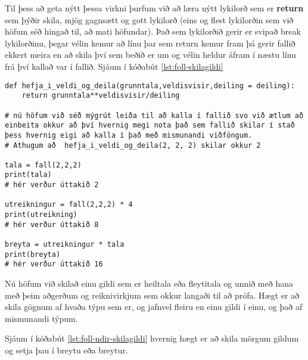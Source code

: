 Til þess að geta nýtt þessa virkni þurfum við að læra nýtt lykilorð sem er \textbf{return} sem þýðir skila, mjög gagnsætt og gott lykilorð (eins og flest lykilorðin sem við höfum séð hingað til, að mati höfundar).
Það sem lykilorðið gerir er svipað break lykilorðinu, þegar vélin kemur að línu þar sem return kemur fram þá gerir fallið ekkert meira en að skila því sem beðið er um og vélin heldur áfram í næstu línu frá því kallað var í fallið.
Sjáum í kóðabút \ref{lst:foll-skilagildi}

\begin{lstlisting}[caption=Hvernig á að láta fall skila gildi með return skipuninni, label=lst:foll-skilagildi]
def hefja_i_veldi_og_deila(grunntala,veldisvisir,deiling = deiling):	
	return grunntala**veldisvisir/deiling
	
# nú höfum við séð mýgrút leiða til að kalla í fallið svo við ætlum að einbeita okkur að því hvernig megi nota það sem fallið skilar í stað þess hvernig eigi að kalla í það með mismunandi viðföngum.
# Athugum að  hefja_i_veldi_og_deila(2, 2, 2) skilar okkur 2

tala = fall(2,2,2)
print(tala)
# hér verður úttakið 2

utreikningur = fall(2,2,2) * 4
print(utreikning)
# hér verður úttakið 8

breyta = utreikningur * tala
print(breyta)
# hér verður úttakið 16
\end{lstlisting}
 
Nú höfum við skilað einu gildi sem er heiltala eða fleytitala og unnið með hana með þeim aðgerðum og reiknivirkjum sem okkur langaði til að prófa.
Hægt er að skila gögnum af hvaða týpu sem er, og jafnvel fleiru en einu gildi í einu, og það af mismunandi týpum.

Sjáum í kóðabút \ref{lst:foll-ndir-skilagildi} hvernig hægt er að skila mörgum gildum og setja þau í breytu eða breytur.

